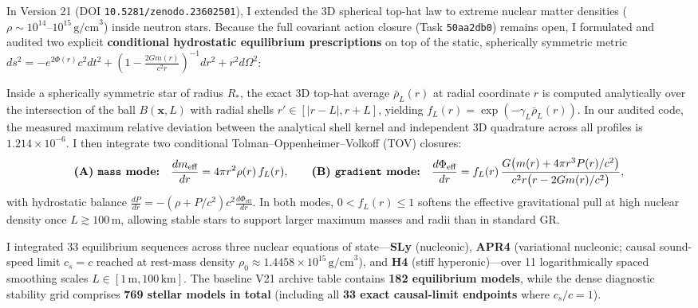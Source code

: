 
In Version 21 (DOI \texttt{10.5281/zenodo.23602501}), I extended the 3D spherical top-hat law to extreme nuclear matter densities ($\rho \sim 10^{14}\text{--}10^{15}\,\text{g/cm}^3$) inside neutron stars. Because the full covariant action closure (Task \texttt{50aa2db0}) remains open, I formulated and audited two explicit \textbf{conditional hydrostatic equilibrium prescriptions} on top of the static, spherically symmetric metric $ds^2 = -e^{2\Phi(r)}c^2 dt^2 + (1 - \frac{2Gm(r)}{c^2 r})^{-1}dr^2 + r^2 d\Omega^2$:

\par
Inside a spherically symmetric star of radius $R_*$, the exact 3D top-hat average $\bar{\rho}_L(r)$ at radial coordinate $r$ is computed analytically over the intersection of the ball $B(\mathbf{x},L)$ with radial shells $r' \in [|r-L|, r+L]$, yielding $f_L(r) = \exp(-\gamma_L\bar{\rho}_L(r))$. In our audited code, the measured maximum relative deviation between the analytical shell kernel and independent 3D quadrature across all profiles is \textbf{$1.214\times 10^{-6}$}. I then integrate two conditional Tolman--Oppenheimer--Volkoff (TOV) closures:
\begin{equation}
  \textbf{(A) \texttt{mass} mode:}\quad \frac{dm_{\text{eff}}}{dr} = 4\pi r^2 \rho(r)\,f_L(r), \qquad
  \textbf{(B) \texttt{gradient} mode:}\quad \frac{d\Phi_{\text{eff}}}{dr} = f_L(r)\,\frac{G\bigl(m(r) + 4\pi r^3 P(r)/c^2\bigr)}{c^2 r\bigl(r - 2Gm(r)/c^2\bigr)},
\end{equation}
with hydrostatic balance $\frac{dP}{dr} = -(\rho + P/c^2)c^2 \frac{d\Phi_{\text{eff}}}{dr}$. In both modes, $0 < f_L(r) \le 1$ softens the effective gravitational pull at high nuclear density once $L \gtrsim 100\,\text{m}$, allowing stable stars to support larger maximum masses and radii than in standard GR.

\par
I integrated 33 equilibrium sequences across three nuclear equations of state---\textbf{SLy} (nucleonic), \textbf{APR4} (variational nucleonic; causal sound-speed limit $c_s = c$ reached at rest-mass density \textbf{$\rho_0 \approx 1.4458\times 10^{15}\,\text{g/cm}^3$}), and \textbf{H4} (stiff hyperonic)---over 11 logarithmically spaced smoothing scales $L \in [1\,\text{m}, 100\,\text{km}]$. The baseline V21 archive table contains \textbf{182 equilibrium models}, while the dense diagnostic stability grid comprises \textbf{769 stellar models in total} (including all \textbf{33 exact causal-limit endpoints} where $c_s/c = 1$).

